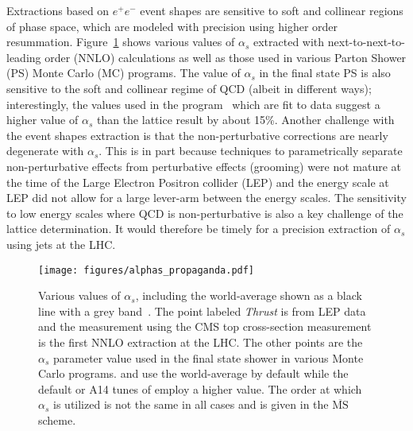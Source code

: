 

Extractions based on $e^+e^-$ event shapes are sensitive to soft and collinear regions of phase space, which are modeled with precision using higher order resummation.  Figure~\ref{fig:propaganda} shows various values of $\alpha_s$ extracted with next-to-next-to-leading order (NNLO) calculations as well as those used in various Parton Shower (PS) Monte Carlo (MC) programs.  The value of $\alpha_s$ in the final state PS is also sensitive to the soft and collinear regime of QCD (albeit in different ways); interestingly, the values used in the \pythia program~\cite{Sjostrand:2006za,Sjostrand:2007gs} which are fit to data suggest a higher value of $\alpha_s$ than the lattice result by about 15\%.   Another challenge with the event shapes extraction is that the non-perturbative corrections are nearly degenerate with $\alpha_s$.   This is in part because techniques to parametrically separate non-perturbative effects from perturbative effects (grooming) were not mature at the time of the Large Electron Positron collider (LEP) and the energy scale at LEP did not allow for a large lever-arm between the energy scales.   The sensitivity to low energy scales where QCD is non-perturbative is also a key challenge of the lattice determination.  It would therefore be timely for a precision extraction of $\alpha_s$ using jets at the LHC.

\begin{figure}
\begin{center}
\texttt{[image: figures/alphas\_propaganda.pdf]}
\end{center}
\caption{Various values of $\alpha_s$, including the world-average shown as a black line with a grey band~\cite{Olive:2016xmw}.  The point labeled \textit{Thrust} is from LEP data and the measurement using the CMS top cross-section measurement is the first NNLO extraction at the LHC.  The other points are the $\alpha_s$ parameter value used in the final state shower in various Monte Carlo programs.  \herwig and \sherpa use the world-average by default while the default or A14 tunes of \pythia employ a higher value.  The order at which $\alpha_s$ is utilized is not the same in all cases and is given in the $\overline{\text{MS}}$ scheme. }
\label{fig:propaganda}
\end{figure}

